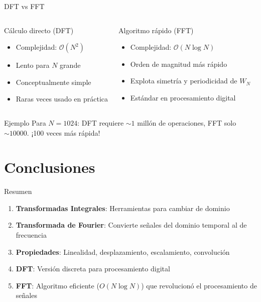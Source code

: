 \documentclass[aspectratio=169]{beamer}
\begin{document}
\begin{frame}{DFT vs FFT}
\begin{columns}[c]
\begin{block}{Cálculo directo (DFT)}
\begin{itemize}
    \item Complejidad: $\mathcal{O}(N^2)$
    \item Lento para $N$ grande
    \item Conceptualmente simple
    \item Raras veces usado en práctica
\end{itemize}
\end{block}

\begin{block}{Algoritmo rápido (FFT)}
\begin{itemize}
    \item Complejidad: $\mathcal{O}(N \log N)$
    \item Orden de magnitud más rápido
    \item Explota simetría y periodicidad de $W_N$
    \item Estándar en procesamiento digital
\end{itemize}
\end{block}
\end{columns}

\vspace{0.5cm}

\begin{alertblock}{Ejemplo}
Para $N=1024$: DFT requiere $\sim 1$ millón de operaciones, FFT solo $\sim 10000$. ¡100 veces más rápida!
\end{alertblock}
\end{frame}

\section{Conclusiones}

\begin{frame}{Resumen}
\begin{enumerate}
    \item \textbf{Transformadas Integrales}: Herramientas para cambiar de dominio
    \item \textbf{Transformada de Fourier}: Convierte señales del dominio temporal al de frecuencia
    \item \textbf{Propiedades}: Linealidad, desplazamiento, escalamiento, convolución
    \item \textbf{DFT}: Versión discreta para procesamiento digital
    \item \textbf{FFT}: Algoritmo eficiente ($O(N \log N)$) que revolucionó el procesamiento de señales
\end{enumerate}
\end{frame}
\end{document}
